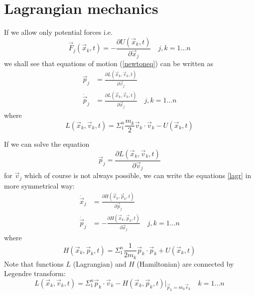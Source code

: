 \section{Lagrangian mechanics}

If we allow only potential forces i.e. 
\begin{equation}
  \label {potforce}
        \vec F_j(\vec x_k,t)=-\frac{\partial U(\vec x_k,t)}{\partial \vec x_j} \quad j,k=1\ldots n 
\end{equation}
we shall see that equations of motion (\ref{newtoneq}) can be written as 
\begin{equation}
   \label {lagr}
   \begin{split}
      \vec p_j&=\frac{\partial L(\vec x_k,\vec v_k,t)}{\partial \vec v_j} \\ 
        \dot \vec p_j&= \frac{\partial L(\vec x_k,\vec v_k,t)}{\partial \vec x_j}\quad j,k=1\ldots n 
   \end{split}
\end{equation}  
where 
\begin{equation}
  \label{lagr3}
        L(\vec x_k,\vec v_k,t)=\Sigma_1^n \frac{m_k}{2} \vec v_k \cdot \vec v_k-U(\vec x_k,t) 
\end{equation}

If we can solve the equation \[ \vec p_j=\frac{\partial L(\vec x_k,\vec v_k,t)}{\partial \vec v_j} \] for $ \vec v_j $
which of course is not always possible, we can write the equations \eqref{lagr}
in more symmetrical way:
\begin{equation}
   \label {ham}
   \begin{split}
        \dot \vec x_j&=\frac{\partial H(\vec x_k,\vec p_k,t)}{\partial \vec p_j}  \\ 
        \dot \vec p_j&= -\frac{\partial H(\vec x_k,\vec p_k,t)}{\partial \vec x_j}\quad j,k=1\ldots n    
   \end{split}
\end{equation}
where 
\begin{equation}
        H(\vec x_k,\vec p_k,t)=\Sigma_1^n \frac{1}{2 m_k} \vec p_k \cdot \vec p_k+U(\vec x_k,t) \label{ham3}
\end{equation}
Note that functions $L$ (Lagrangian) and $H$ (Hamiltonian) are connected by Legendre transform:
\begin{equation}
        L(\vec x_k,\vec v_k,t)=\Sigma_1^n  \vec p_k \cdot \vec v_k -H(\vec x_k,\vec p_k,t)|_{\vec p_k=m_k\vec v_k}
\quad k=1\ldots n \label {lagr-ham}
\end{equation}



